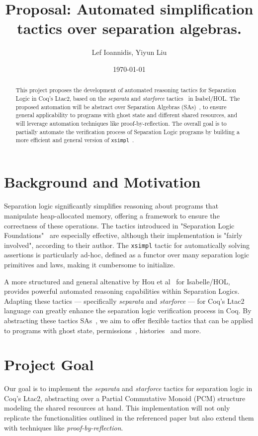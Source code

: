 \documentclass[12pt,lettersize]{article}
\title{Proposal: Automated simplification tactics over separation algebras.}
\author{Lef Ioannidis, Yiyun Liu}
\date{\today}
\begin{document}
\maketitle


\begin{abstract}
This project proposes the development of automated reasoning tactics for Separation Logic in Coq's Ltac2, based on the \emph{separata}
and \emph{starforce} tactics~\cite{hou2017proof} in Isabel/HOL. The proposed automation will be
abstract over Separation Algebras (SAs)~\cite{calcagno2007local}, to ensure general applicability to programs with 
ghost state and different shared resources, and will leverage automation techniques like proof-by-reflection.
The overall goal is to partially automate the verification process of Separation Logic programs by building
a more efficient and general version of \texttt{xsimpl}~\cite{chargueraud2020separation}.
\end{abstract}

\section{Background and Motivation}
Separation logic significantly simplifies reasoning about programs that manipulate heap-allocated memory, offering a framework
to ensure the correctness of these operations. The tactics introduced in "Separation Logic Foundations"~\cite{chargueraud2020separation}
are especially effective, although their implementation is "fairly involved", according to their author. The \texttt{xsimpl} tactic
for automatically solving assertions is particularly ad-hoc, defined as a functor over many separation logic primitives and laws,
making it cumbersome to initialize.

A more structured and general altenative by Hou et al~\cite{hou2017proof} for Isabelle/HOL, provides powerful automated reasoning
capabilities within Separation Logics. Adapting these tactics --- specifically \emph{separata} and 
\emph{starforce} --- for Coq's Ltac2 language can greatly enhance the separation logic verification process in Coq.
By abstracting these tactics SAs~\cite{calcagno2007local}, we aim to offer
flexible tactics that can be applied to programs with ghost state, permissions~\cite{bornat2005permission}, 
histories~\cite{sergey2015specifying} and more.

\section{Project Goal}
Our goal is to implement the \emph{separata} and \emph{starforce} tactics for separation logic in Coq's Ltac2, abstracting over
a Partial Commutative Monoid (PCM) structure modeling the shared resources at hand. This implementation will not only replicate
the functionalities outlined in the referenced paper but also extend them with techniques
like \emph{proof-by-reflection}.
\end{document}
